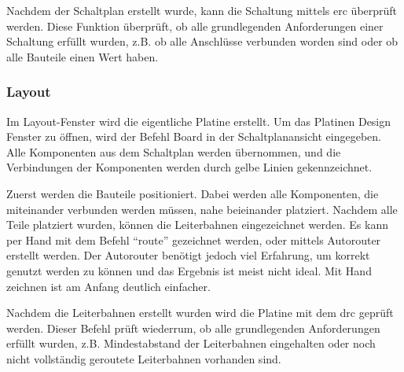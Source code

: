 Nachdem der Schaltplan erstellt wurde, kann die Schaltung mittels \ac{erc} überprüft werden.
Diese Funktion überprüft, ob alle grundlegenden Anforderungen einer Schaltung erfüllt wurden, z.B. ob alle Anschlüsse verbunden worden sind oder ob alle Bauteile einen Wert haben.

\subsubsection{Layout}
Im Layout-Fenster wird die eigentliche Platine erstellt.
Um das Platinen Design Fenster zu öffnen, wird der Befehl Board in der Schaltplanansicht eingegeben.
Alle Komponenten aus dem Schaltplan werden übernommen, und die Verbindungen der Komponenten werden durch gelbe Linien gekennzeichnet.\par

Zuerst werden die Bauteile positioniert. Dabei werden alle Komponenten, die miteinander verbunden werden müssen, nahe beieinander platziert.
Nachdem alle Teile platziert wurden, können die Leiterbahnen eingezeichnet werden.
Es kann per Hand mit dem Befehl \enquote{route} gezeichnet werden, oder mittels Autorouter erstellt werden.
Der Autorouter benötigt jedoch viel Erfahrung, um korrekt genutzt werden zu können und das Ergebnis ist meist nicht ideal.
Mit Hand zeichnen ist am Anfang deutlich einfacher.\par

Nachdem die Leiterbahnen erstellt wurden wird die Platine mit dem \ac{drc} geprüft werden.
Dieser Befehl prüft wiederrum, ob alle grundlegenden Anforderungen erfüllt wurden, z.B. Mindestabstand der Leiterbahnen eingehalten oder noch nicht vollständig geroutete Leiterbahnen vorhanden sind.